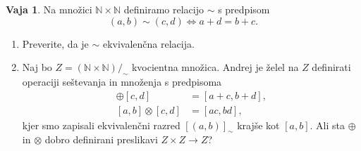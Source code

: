 \documentclass{article}
\newcommand{\NN}{\mathbb{N}}
\theoremstyle{definition}
\newtheorem{vaja}{Vaja}
\begin{document}




\begin{vaja}
  Na množici $\NN \times \NN$ definiramo relacijo $\sim$ s predpisom
  \begin{equation*}
    (a,b) \sim (c,d) \iff a + d = b + c.
  \end{equation*}
  \begin{enumerate}
    \item
      Preverite, da je $\sim$ ekvivalenčna relacija.
    \item
      Naj bo $Z = (\NN \times \NN)/_\sim$ kvocientna množica. Andrej je želel na $Z$ definirati operaciji seštevanja in množenja s predpisoma
      \begin{align*}
        [a,b] \oplus [c,d] &= [a+c, b+d],\\
        [a,b] \otimes [c,d] &= [a c, b d],
      \end{align*}
      kjer smo zapisali ekvivalenčni razred $[(a,b)]_\sim$ krajše kot $[a,b]$. Ali sta $\oplus$ in $\otimes$ dobro definirani preslikavi $Z \times Z \to Z$? 
  \end{enumerate}
\end{vaja}
\end{document}
